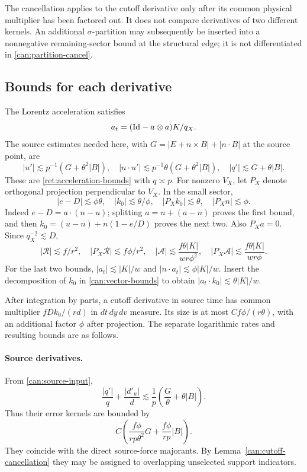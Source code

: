 The cancellation applies to the cutoff derivative only after its common
physical multiplier has been factored out. It does not compare derivatives
of two different kernels. An additional $\sigma$-partition may subsequently
be inserted into a nonnegative remaining-sector bound at the structural
edge; it is not differentiated in \eqref{can:partition-cancel}.

\subsection{Bounds for each derivative}

The Lorentz acceleration satisfies
\[
 a_t=(\mathrm{Id}-a\otimes a)K/q_X.
\]
The source estimates needed here, with
$G=|E+n\times B|+|n\cdot B|$ at the source point, are
\begin{equation}\label{can:source-input}
 |u'|\lesssim p^{-1}(G+\theta^2|B|),\quad
 |n\cdot u'|\lesssim p^{-1}\theta(G+\theta^2|B|),\quad
 |q'|\lesssim G+\theta|B|.
\end{equation}
These are \eqref{ret:acceleration-bounds} with $q\asymp p$.
For nonzero $V_X$, let $P_X$ denote orthogonal projection perpendicular
to $V_X$. In the small sector,
\begin{equation}\label{can:vector-bounds}
 |e-D|\lesssim\phi\theta,\quad
 |k_0|\lesssim\theta/\phi,\quad
 |P_Xk_0|\lesssim\theta,\quad
 |P_Xn|\lesssim\phi.
\end{equation}
Indeed $e-D=a\cdot(n-u)$; splitting $a=n+(a-n)$ proves the first bound,
and then $k_0=(u-n)+n(1-e/D)$ proves the next two.
Also $P_Xa=0$. Since $q_X^{-2}\lesssim D$,
\begin{equation}\label{can:bulk-bounds}
 |\mathcal R|\lesssim f/r^2,\quad
 |P_X\mathcal R|\lesssim f\phi/r^2,\quad
 |\mathcal A|\lesssim\frac{f\theta|K|}{wr\phi^2},\quad
 |P_X\mathcal A|\lesssim\frac{f\theta|K|}{wr\phi}.
\end{equation}
For the last two bounds, $|a_t|\lesssim|K|/w$ and
$|n\cdot a_t|\lesssim\phi|K|/w$. Insert the decomposition of $k_0$
in \eqref{can:vector-bounds} to obtain
$|a_t\cdot k_0|\lesssim\theta|K|/w$.

After integration by parts, a cutoff derivative in source time has common
multiplier $fDk_0/(rd)$ in $dt\,dy\,dv$ measure. Its size is at most
$Cf\phi/(r\theta)$, with an additional factor $\phi$ after projection.
The separate logarithmic rates and resulting bounds are as follows.

\paragraph{Source derivatives.}
From \eqref{can:source-input},
\[
 \frac{|q'|}{q}+\frac{|d'_u|}{d}
 \lesssim\frac1p\left(\frac G\theta+\theta|B|\right).
\]
Thus their error kernels are bounded by
\begin{equation}\label{can:source-cutoff-bound}
 C\left(\frac{f\phi}{rp\theta^2}G
            +\frac{f\phi}{rp}|B|\right).
\end{equation}
They coincide with the direct source-force majorants. By
Lemma~\ref{can:cutoff-cancellation} they may be assigned to overlapping
unselected support indicators.

